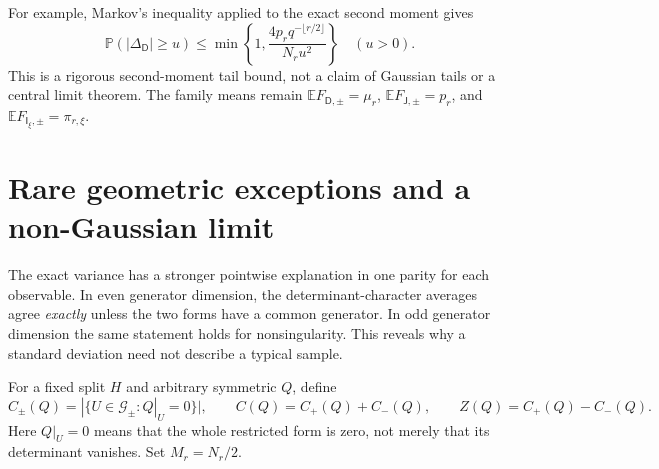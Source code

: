 \documentclass[11pt,a4paper]{article}
\theoremstyle{definition}
\theoremstyle{remark}
\newcommand{\E}{\mathbb E}
\newcommand{\Pp}{\mathbb P}
\newcommand{\J}{\mathsf J}
\newcommand{\D}{\mathsf D}
\newcommand{\I}{\mathsf I}
\newcommand{\G}{\mathcal G}
\begin{document}
For example, Markov's inequality applied to the exact second moment gives
\begin{equation}\label{eq:contrast-tail}
 \Pp(|\Delta_\D|\ge u)
 \le\min\left\{1,\frac{4p_rq^{-\lfloor r/2\rfloor}}{N_ru^2}\right\}
 \quad(u>0).
\end{equation}
This is a rigorous second-moment tail bound, not a claim of Gaussian tails
or a central limit theorem. The family means remain
$\E F_{\D,\pm}=\mu_r$, $\E F_{\J,\pm}=p_r$, and
$\E F_{\I_\xi,\pm}=\pi_{r,\xi}$.

\section{Rare geometric exceptions and a non-Gaussian limit}
\label{sec:rare}
The exact variance has a stronger pointwise explanation in one parity for
each observable. In even generator dimension, the determinant-character
averages agree \emph{exactly} unless the two forms have a common generator.
In odd generator dimension the same statement holds for nonsingularity.
This reveals why a standard deviation need not describe a typical sample.

For a fixed split $H$ and arbitrary symmetric $Q$, define
\begin{equation}\label{eq:common-counts}
 C_\pm(Q)=|\{U\in\G_\pm:Q|_U=0\}|,\qquad
 C(Q)=C_+(Q)+C_-(Q),\qquad Z(Q)=C_+(Q)-C_-(Q).
\end{equation}
Here $Q|_U=0$ means that the whole restricted form is zero, not merely
that its determinant vanishes. Set $M_r=N_r/2$.
\end{document}
